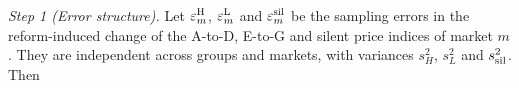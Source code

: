 \emph{Step 1 (Error structure).} Let $\varepsilon^{\rm H}_m$, $\varepsilon^{\rm L}_m$ and $\varepsilon^{\rm sil}_m$ be the sampling errors in the reform-induced change of the A-to-D, E-to-G and silent price indices of market $m$. They are independent across groups and markets, with variances $s_H^2$, $s_L^2$ and $s_{\rm sil}^2$. Then

